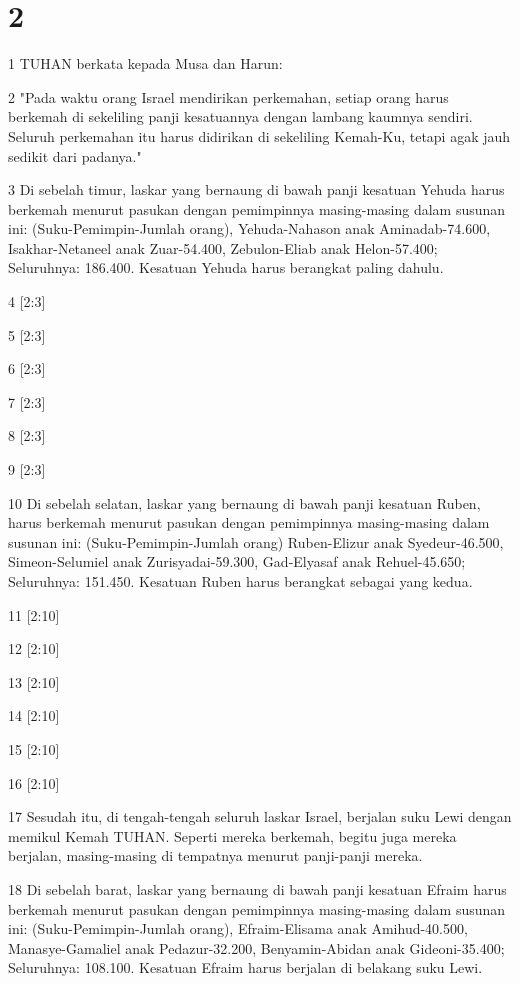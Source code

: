 \chapter{2}

\par 1 TUHAN berkata kepada Musa dan Harun:
\par 2 "Pada waktu orang Israel mendirikan perkemahan, setiap orang harus berkemah di sekeliling panji kesatuannya dengan lambang kaumnya sendiri. Seluruh perkemahan itu harus didirikan di sekeliling Kemah-Ku, tetapi agak jauh sedikit dari padanya."
\par 3 Di sebelah timur, laskar yang bernaung di bawah panji kesatuan Yehuda harus berkemah menurut pasukan dengan pemimpinnya masing-masing dalam susunan ini: (Suku-Pemimpin-Jumlah orang), Yehuda-Nahason anak Aminadab-74.600, Isakhar-Netaneel anak Zuar-54.400, Zebulon-Eliab anak Helon-57.400; Seluruhnya: 186.400. Kesatuan Yehuda harus berangkat paling dahulu.
\par 4 [2:3]
\par 5 [2:3]
\par 6 [2:3]
\par 7 [2:3]
\par 8 [2:3]
\par 9 [2:3]
\par 10 Di sebelah selatan, laskar yang bernaung di bawah panji kesatuan Ruben, harus berkemah menurut pasukan dengan pemimpinnya masing-masing dalam susunan ini: (Suku-Pemimpin-Jumlah orang) Ruben-Elizur anak Syedeur-46.500, Simeon-Selumiel anak Zurisyadai-59.300, Gad-Elyasaf anak Rehuel-45.650; Seluruhnya: 151.450. Kesatuan Ruben harus berangkat sebagai yang kedua.
\par 11 [2:10]
\par 12 [2:10]
\par 13 [2:10]
\par 14 [2:10]
\par 15 [2:10]
\par 16 [2:10]
\par 17 Sesudah itu, di tengah-tengah seluruh laskar Israel, berjalan suku Lewi dengan memikul Kemah TUHAN. Seperti mereka berkemah, begitu juga mereka berjalan, masing-masing di tempatnya menurut panji-panji mereka.
\par 18 Di sebelah barat, laskar yang bernaung di bawah panji kesatuan Efraim harus berkemah menurut pasukan dengan pemimpinnya masing-masing dalam susunan ini: (Suku-Pemimpin-Jumlah orang), Efraim-Elisama anak Amihud-40.500, Manasye-Gamaliel anak Pedazur-32.200, Benyamin-Abidan anak Gideoni-35.400; Seluruhnya: 108.100. Kesatuan Efraim harus berjalan di belakang suku Lewi.
